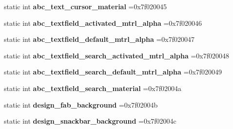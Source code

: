\begin{DoxyCompactItemize}
static int {\bfseries abc\+\_\+text\+\_\+cursor\+\_\+material} =0x7f020045
\item 
\mbox{\label{classandroid_1_1support_1_1design_1_1R_1_1drawable_acc210615a9d3721ee09cba6dd81c77a1}} 
static int {\bfseries abc\+\_\+textfield\+\_\+activated\+\_\+mtrl\+\_\+alpha} =0x7f020046
\item 
\mbox{\label{classandroid_1_1support_1_1design_1_1R_1_1drawable_adc9491a408cd023f03a152c2ae8c65ca}} 
static int {\bfseries abc\+\_\+textfield\+\_\+default\+\_\+mtrl\+\_\+alpha} =0x7f020047
\item 
\mbox{\label{classandroid_1_1support_1_1design_1_1R_1_1drawable_a0c7d8dff838e99a64471452d57310d58}} 
static int {\bfseries abc\+\_\+textfield\+\_\+search\+\_\+activated\+\_\+mtrl\+\_\+alpha} =0x7f020048
\item 
\mbox{\label{classandroid_1_1support_1_1design_1_1R_1_1drawable_a924cd635c43c9c9e6028093396e1c227}} 
static int {\bfseries abc\+\_\+textfield\+\_\+search\+\_\+default\+\_\+mtrl\+\_\+alpha} =0x7f020049
\item 
\mbox{\label{classandroid_1_1support_1_1design_1_1R_1_1drawable_af9365e3b8580408968f9526375c70d0e}} 
static int {\bfseries abc\+\_\+textfield\+\_\+search\+\_\+material} =0x7f02004a
\item 
\mbox{\label{classandroid_1_1support_1_1design_1_1R_1_1drawable_a787da32948f804ea4ba5360bb1435ea0}} 
static int {\bfseries design\+\_\+fab\+\_\+background} =0x7f02004b
\item 
\mbox{\label{classandroid_1_1support_1_1design_1_1R_1_1drawable_ad9f7cb7dbb6efda8b0e203d626285d2f}} 
static int {\bfseries design\+\_\+snackbar\+\_\+background} =0x7f02004c
\item 
\mbox{\label{classandroid_1_1support_1_1design_1_1R_1_1drawable_a63b5abb0f20263f980e52a12a3fb4956}} 

\end{DoxyCompactItemize}
